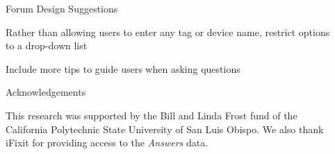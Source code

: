 \documentclass[final]{beamer}
\newlength{\sepwid}
\newlength{\onecolwid}
\newlength{\twocolwid}
\begin{document}
\begin{frame}[t]
\begin{columns}[t]
\begin{column}{\twocolwid}
\begin{columns}[t,totalwidth=\twocolwid]
\begin{column}{\onecolwid}

\end{column} %

\begin{column}{\onecolwid} %

\begin{block}{Forum Design Suggestions}

\textcolor{dblue!70}{} Rather than allowing users to enter any tag or device name, restrict options to a drop-down list

\vspace{0.5ex}

\textcolor{dblue!70}{} Include more tips to guide users when asking questions 

\end{block}

\vspace{1ex}

\begin{block}{Acknowledgements}

This research was supported by the Bill and Linda Frost fund of the California Polytechnic State University of San Luis Obispo. We also thank iFixit for providing access to the \textit{Answers} data.

\end{block}


\end{column} %

\end{columns} %

\end{column} %







\end{columns}
\end{frame}
\end{document}
